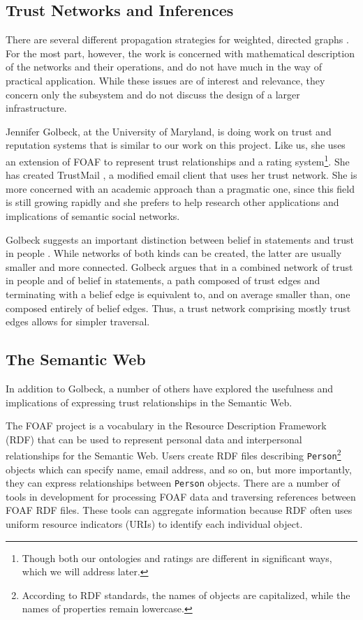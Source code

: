 \documentclass{acm_proc_article-sp}
\begin{document}
\subsection{Trust Networks and Inferences}
There are several different propagation strategies for weighted, directed graphs \citep{richardson03management} \citep{abdul-rahman:relying} \citep{guha04propagation}.  For the most part, however, the work is concerned with mathematical description of the networks and their operations, and do not have much in the way of practical application.  While these issues are of interest and relevance, they concern only the subsystem and do not discuss the design of a larger infrastructure.

Jennifer Golbeck, at the University of Maryland, is doing work on trust and reputation systems  \citep{golbeckSite} that is similar to our work on this project.  Like us, she uses an extension of FOAF to represent trust relationships and a rating system\footnote{Though both our ontologies and ratings are different in significant ways, which we will address later.}.  She has created TrustMail  \citep{trustMail}, a modified email client that uses her trust network.  She is more concerned with an academic approach than a pragmatic one, since this field is still growing rapidly and she prefers to help research other applications and implications of semantic social networks.

Golbeck suggests an important distinction between belief in statements and trust in people \citep{golbeck:accuracy}.  While networks of both kinds can be created, the latter are usually smaller and more connected.  Golbeck argues that in a combined network of trust in people and of belief in statements, a path composed of trust edges and terminating with a belief edge is equivalent to, and on average smaller than, one composed entirely of belief edges.  Thus, a trust network comprising mostly trust edges allows for simpler traversal.

\subsection{The Semantic Web}
In addition to Golbeck, a number of others have explored the usefulness and implications of expressing trust relationships in the Semantic Web.

\label{foaf}
The FOAF project \citep{foafProject} is a vocabulary in the Resource Description Framework (RDF) that can be used to represent personal data and interpersonal relationships for the Semantic Web.  Users create RDF files describing \texttt{Person}\footnote{According to RDF standards, the names of objects are capitalized, while the names of properties remain lowercase.} objects which can specify name, email address, and so on, but more importantly, they can express relationships between \texttt{Person} objects.  There are a number of tools in development for processing FOAF data and traversing references between FOAF RDF files.  These tools can aggregate information because RDF often uses uniform resource indicators (URIs) to identify each individual object.
\end{document}
